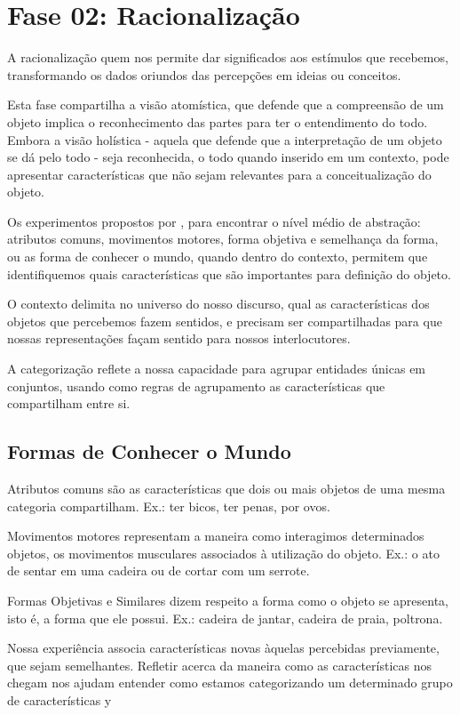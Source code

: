 \section{\hspace*{3pt} Fase 02: Racionalização}
\label{sec:racionalizacao}

A racionalização quem nos permite dar significados aos estímulos que recebemos, transformando os dados oriundos das percepções em ideias ou conceitos.

Esta fase compartilha a visão atomística, que defende que a compreensão de um objeto implica o reconhecimento das partes para ter o entendimento do todo. Embora a visão holística - aquela que defende que a interpretação de um objeto se dá pelo todo - seja reconhecida, o todo quando inserido em um contexto, pode apresentar características que não sejam relevantes para a conceitualização do objeto.

Os experimentos propostos por , para encontrar o nível médio de abstração: atributos comuns, movimentos motores, forma objetiva e semelhança da forma, ou as forma de conhecer o mundo, quando dentro do contexto, permitem que identifiquemos quais características que são importantes para definição do objeto. 

O contexto delimita no universo do nosso discurso, qual as características dos objetos que percebemos fazem sentidos, e precisam ser compartilhadas para que nossas representações façam sentido para nossos interlocutores.  

A categorização reflete a nossa capacidade para agrupar entidades únicas em conjuntos, usando como regras de agrupamento as características que compartilham entre si. 

\subsection{\hspace*{3pt} Formas de Conhecer o Mundo}

Atributos comuns são as características que dois ou mais objetos de uma mesma categoria compartilham. Ex.: ter bicos, ter penas, por ovos.

Movimentos motores representam a maneira como interagimos determinados objetos, os movimentos musculares associados à utilização do objeto. Ex.: o ato de sentar em uma cadeira ou de cortar com um serrote.

Formas Objetivas e Similares dizem respeito a forma como o objeto se apresenta, isto é, a forma que ele possui. Ex.: cadeira de jantar, cadeira de praia, poltrona.

Nossa experiência associa características novas àquelas percebidas previamente, que sejam semelhantes. Refletir acerca da maneira como as características nos chegam nos ajudam entender como estamos categorizando um determinado grupo de características
            y
